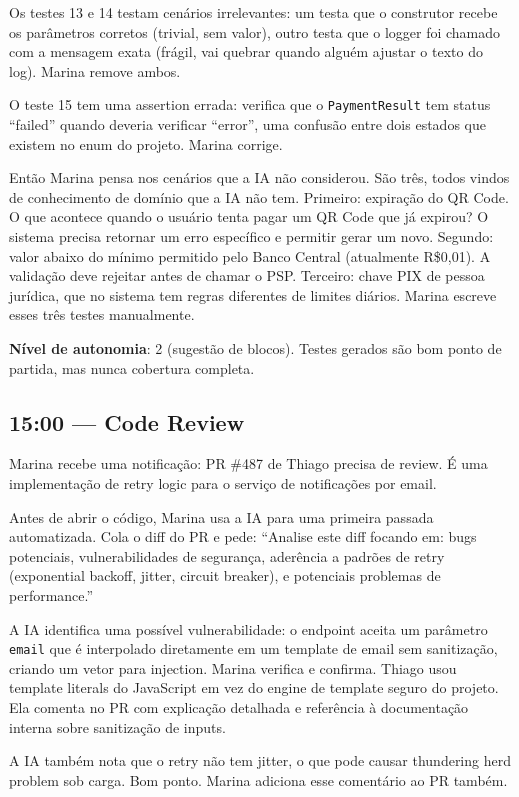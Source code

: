 Os testes 13 e 14 testam cenários irrelevantes: um testa que o construtor recebe os
parâmetros corretos (trivial, sem valor), outro testa que o logger foi chamado com a
mensagem exata (frágil, vai quebrar quando alguém ajustar o texto do log). Marina
remove ambos.

O teste 15 tem uma assertion errada: verifica que o \texttt{PaymentResult} tem status
``failed'' quando deveria verificar ``error'', uma confusão entre dois estados que
existem no enum do projeto. Marina corrige.

Então Marina pensa nos cenários que a IA não considerou. São três, todos vindos de
conhecimento de domínio que a IA não tem. Primeiro: expiração do QR Code. O que
acontece quando o usuário tenta pagar um QR Code que já expirou? O sistema precisa
retornar um erro específico e permitir gerar um novo. Segundo: valor abaixo do mínimo
permitido pelo Banco Central (atualmente R\$0,01). A validação deve rejeitar antes
de chamar o PSP. Terceiro: chave PIX de pessoa jurídica, que no sistema tem regras
diferentes de limites diários. Marina escreve esses três testes manualmente.

\textbf{Nível de autonomia}: 2 (sugestão de blocos). Testes gerados são
bom ponto de partida, mas nunca cobertura completa.

\subsection{15:00 --- Code Review}

Marina recebe uma notificação: PR \#487 de Thiago precisa de review. É uma
implementação de retry logic para o serviço de notificações por email.

Antes de abrir o código, Marina usa a IA para uma primeira passada automatizada.
Cola o diff do PR e pede: ``Analise este diff focando em: bugs potenciais,
vulnerabilidades de segurança, aderência a padrões de retry (exponential backoff,
jitter, circuit breaker), e potenciais problemas de performance.''

A IA identifica uma possível vulnerabilidade: o endpoint aceita um parâmetro
\texttt{email} que é interpolado diretamente em um template de email sem sanitização,
criando um vetor para injection. Marina verifica e confirma. Thiago usou
template literals do JavaScript em vez do engine de template seguro do projeto. Ela
comenta no PR com explicação detalhada e referência à documentação interna sobre
sanitização de inputs.

A IA também nota que o retry não tem jitter, o que pode causar thundering herd
problem sob carga. Bom ponto. Marina adiciona esse comentário ao PR também.

